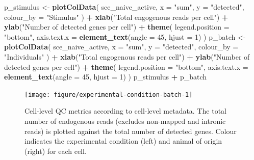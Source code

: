 \documentclass[9pt,a4paper,]{extarticle}
\newenvironment{Shaded}{\begin{snugshade}}{\end{snugshade}}
\newcommand{\DataTypeTok}[1]{\textcolor[rgb]{0.13,0.29,0.53}{#1}}
\newcommand{\DecValTok}[1]{\textcolor[rgb]{0.00,0.00,0.81}{#1}}
\newcommand{\KeywordTok}[1]{\textcolor[rgb]{0.13,0.29,0.53}{\textbf{#1}}}
\newcommand{\NormalTok}[1]{#1}
\newcommand{\OperatorTok}[1]{\textcolor[rgb]{0.81,0.36,0.00}{\textbf{#1}}}
\newcommand{\StringTok}[1]{\textcolor[rgb]{0.31,0.60,0.02}{#1}}
\begin{document}
\begin{Shaded}
\begin{Highlighting}[]
\NormalTok{p_stimulus <-}\StringTok{ }\KeywordTok{plotColData}\NormalTok{(}
\NormalTok{    sce_naive_active,}
    \DataTypeTok{x =} \StringTok{"sum"}\NormalTok{,}
    \DataTypeTok{y =} \StringTok{"detected"}\NormalTok{, }
    \DataTypeTok{colour_by =} \StringTok{"Stimulus"}
\NormalTok{  ) }\OperatorTok{+}
\StringTok{  }\KeywordTok{xlab}\NormalTok{(}\StringTok{"Total engogenous reads per cell"}\NormalTok{) }\OperatorTok{+}
\StringTok{  }\KeywordTok{ylab}\NormalTok{(}\StringTok{"Number of detected genes per cell"}\NormalTok{) }\OperatorTok{+}
\StringTok{  }\KeywordTok{theme}\NormalTok{(}
    \DataTypeTok{legend.position =} \StringTok{"bottom"}\NormalTok{,}
    \DataTypeTok{axis.text.x =} \KeywordTok{element_text}\NormalTok{(}\DataTypeTok{angle =} \DecValTok{45}\NormalTok{, }\DataTypeTok{hjust =} \DecValTok{1}\NormalTok{)}
\NormalTok{  )}
\NormalTok{p_batch <-}\StringTok{ }\KeywordTok{plotColData}\NormalTok{(}
\NormalTok{    sce_naive_active,}
    \DataTypeTok{x =} \StringTok{"sum"}\NormalTok{,}
    \DataTypeTok{y =} \StringTok{"detected"}\NormalTok{, }
    \DataTypeTok{colour_by =} \StringTok{"Individuals"}
\NormalTok{  ) }\OperatorTok{+}
\StringTok{  }\KeywordTok{xlab}\NormalTok{(}\StringTok{"Total engogenous reads per cell"}\NormalTok{) }\OperatorTok{+}
\StringTok{  }\KeywordTok{ylab}\NormalTok{(}\StringTok{"Number of detected genes per cell"}\NormalTok{) }\OperatorTok{+}
\StringTok{  }\KeywordTok{theme}\NormalTok{(}
    \DataTypeTok{legend.position =} \StringTok{"bottom"}\NormalTok{,}
    \DataTypeTok{axis.text.x =} \KeywordTok{element_text}\NormalTok{(}\DataTypeTok{angle =} \DecValTok{45}\NormalTok{, }\DataTypeTok{hjust =} \DecValTok{1}\NormalTok{)}
\NormalTok{  )}
\NormalTok{p_stimulus }\OperatorTok{+}\StringTok{ }\NormalTok{p_batch}
\end{Highlighting}
\end{Shaded}

\begin{figure}

{\centering \texttt{[image: figure/experimental-condition-batch-1]} 

}

\caption{Cell-level QC metrics according to cell-level metadata. The total number of endogenous reads (excludes non-mapped and intronic reads) is plotted against the total number of detected genes. Colour indicates the experimental condition (left) and animal of origin (right) for each cell.}\label{fig:experimental-condition-batch}
\end{figure}
\end{document}
